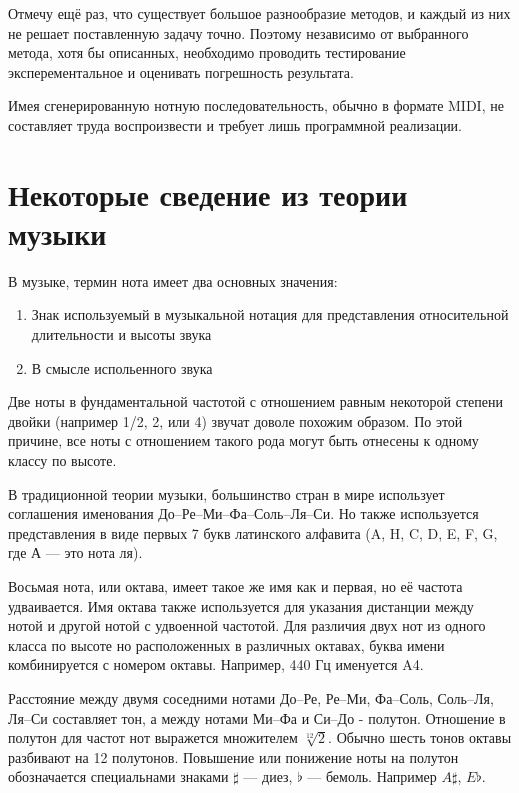 \documentclass[oneside, final, 14pt]{extarticle}
\begin{document}
  Отмечу ещё раз, что существует большое разнообразие методов, и каждый из них
  не решает поставленную задачу точно. Поэтому независимо от выбранного метода, хотя
  бы описанных, необходимо проводить тестирование эксперементальное и оценивать
  погрешность результата.

  Имея сгенерированную нотную последовательность, обычно в формате MIDI, не составляет
  труда воспроизвести и требует лишь программной реализации.
\cleardoublepage

\section{Некоторые сведение из теории музыки}

  В музыке, термин нота имеет два основных значения:

  \begin{enumerate}
    \item Знак используемый в музыкальной нотация для представления
      относительной длительности и высоты звука
    \item В смысле испольенного звука
  \end{enumerate}

  Две ноты в фундаментальной частотой с отношением равным некоторой
  степени двойки (например 1/2, 2, или 4) звучат доволе похожим
  образом. По этой причине, все ноты с отношением такого рода могут
  быть отнесены к одному классу по высоте.

  В традиционной теории музыки, большинство стран в мире использует
  соглашения именования До--Ре--Ми--Фа--Соль--Ля--Си. Но также используется
  представления в виде первых 7 букв латинского алфавита (A, H, C, D,
  E, F, G, где А --- это нота ля).

  Восьмая нота, или октава, имеет такое же имя как и первая, но её частота
  удваивается. Имя октава также используется для указания дистанции между
  нотой и другой нотой с удвоенной частотой. Для различия двух нот из одного
  класса по высоте но расположенных в различных октавах, буква имени
  комбинируется с номером октавы. Например, 440 Гц именуется A4.

  Расстояние между двумя соседними нотами До--Ре, Ре--Ми, Фа--Соль, Соль--Ля,
  Ля--Си составляет тон, а между нотами Ми--Фа и Си--До - полутон. Отношение
  в полутон для частот нот выражется множителем $\sqrt[12]{2}$. Обычно
  шесть тонов октавы разбивают на 12 полутонов. Повышение или понижение
  ноты на полутон обозначается специальнами знаками $\sharp$ --- диез,
  $\flat$ --- бемоль. Например $A\sharp$, $E\flat$.
\end{document}

